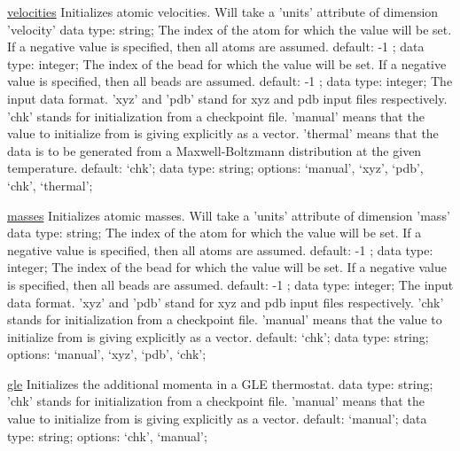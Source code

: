 \begin{ipifield}{}
\begin{ipifield}{\hyperref[INITVELOCITIES]{velocities}}%
{Initializes atomic velocities. Will take a 'units' attribute of dimension 'velocity'}%
{data type: string; }%
{%
{The index of the atom for which the value will be set. If a negative value is specified, then all atoms are assumed.}%
{default:  -1 ; data type: integer; }%
%
{The index of the bead for which the value will be set. If a negative value is specified, then all beads are assumed.}%
{default:  -1 ; data type: integer; }%
%
{The input data format. 'xyz' and 'pdb' stand for xyz and pdb input files respectively. 'chk' stands for initialization from a checkpoint file. 'manual' means that the value to initialize from is giving explicitly as a vector. 'thermal' means that the data is to be generated from a Maxwell-Boltzmann distribution at the given temperature.}%
{default: `chk'; data type: string; options: `manual', `xyz', `pdb', `chk', `thermal'; }%
}
\end{ipifield}
\begin{ipifield}{\hyperref[INITMASSES]{masses}}%
{Initializes atomic masses. Will take a 'units' attribute of dimension 'mass'}%
{data type: string; }%
{%
{The index of the atom for which the value will be set. If a negative value is specified, then all atoms are assumed.}%
{default:  -1 ; data type: integer; }%
%
{The index of the bead for which the value will be set. If a negative value is specified, then all beads are assumed.}%
{default:  -1 ; data type: integer; }%
%
{The input data format. 'xyz' and 'pdb' stand for xyz and pdb input files respectively. 'chk' stands for initialization from a checkpoint file. 'manual' means that the value to initialize from is giving explicitly as a vector.}%
{default: `chk'; data type: string; options: `manual', `xyz', `pdb', `chk'; }%
}
\end{ipifield}
\begin{ipifield}{\hyperref[INITTHERMO]{gle}}%
{Initializes the additional momenta in a GLE thermostat.}%
{data type: string; }%
{%
{'chk' stands for initialization from a checkpoint file. 'manual' means that the value to initialize from is giving explicitly as a vector.}%
{default: `manual'; data type: string; options: `chk', `manual'; }%
}
\end{ipifield}
\end{ipifield}
